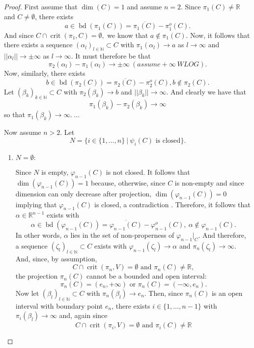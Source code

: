 \documentclass[11pt]{article}
\theoremstyle{definition}
\newcommand{\N}{\mathbb{N}}
\newcommand{\R}{\mathbb{R}}
\newcommand{\vp}{\varphi}
\DeclareMathOperator{\bd}{bd}
\DeclareMathOperator{\crit}{crit}
\begin{document}
\begin{proof}
First assume that $\dim(C)=1$ and assume $n=2$. Since $\pi_1(C) \not = \R$ and $C \not = \emptyset$, there exists 
\[
a \in \bd(\pi_1(C)) = \overline{\pi_1(C)} - \pi_1^o(C).
\]
And since $C \cap \crit(\pi_1,C) = \emptyset,$ we know that $a \not \in \pi_1(C).$ Now, it follows that there exists a sequence $(\alpha_l)_{l \in \N} \subset C$ with $\pi_1(\alpha_l) \rightarrow a$ as $l \rightarrow \infty$ and $|| \alpha_l|| \rightarrow \pm\infty$ as $l \rightarrow \infty.$ It must therefore be that 
\[
\pi_2(\alpha_l) - \pi_1(\alpha_l) \rightarrow \pm\infty ~(assume +\infty~ WLOG).
\]
Now, similarly, there exists 
\[
b \in \bd(\pi_2(C)) = \overline{\pi_2(C)} - \pi_2^o(C), b \not \in \pi_2(C).
\]
Let $(\beta_k)_{k \in \N} \subset C$ with $\pi_2(\beta_k) \rightarrow b$ and $|| \beta_k|| \rightarrow \infty.$ And clearly we have that 
\[
\pi_1(\beta_k) - \pi_2(\beta_k) \rightarrow \infty
\]
so that $\pi_1(\beta_k) \rightarrow \infty.~\hdots$
%
%
%
\par 
Now assume $n>2.$ Let 
\[
N = \big\{i \in \{1,\hdots,n\} ~|~ \psi_i(C) \textrm{ is closed}\big\}. 
\]
\begin{enumerate}
    \item $N = \emptyset:$ 
    \par 
    Since $N$ is empty, $\vp_{n-1}(C)$ is not closed. It follows that $\dim(\vp_{n-1}(C))=1$ because, otherwise, since $C$ is non-empty  and since dimension can only decrease after projection, $\dim(\vp_{n-1}(C))=0$ implying that $\vp_{n-1}(C)$ is closed, a contradiction \lightning. Therefore, it follows that $\alpha \in \R^{n-1}$ exists with 
    \[
    \alpha \in \bd(\vp_{n-1}(C)) = \overline{\vp_{n-1}(C)} - \vp_{n-1}^o(C),~ \alpha \not \in \vp_{n-1}(C).
    \]
    In other words, $\alpha$ lies in the set of non-properness of $\vp_{n-1}|_C$. And therefore, a sequence $(\zeta_l)_{l \in \N} \subset C$ exists with $\vp_{n-1}(\zeta_l) \rightarrow \alpha$ and $\pi_n(\zeta_l) \rightarrow \infty.$ And, since, by assumption, 
\[
    C \cap \crit(\pi_n,V) = \emptyset \textrm{ and  } \pi_n(C) \not = \R,
\]
the projection $\pi_n(C)$ cannot be a bounded and open interval:
\[
\pi_n(C) = (e_n,+\infty) \textrm{ or } \pi_n(C) = (-\infty,e_n). 
\]
Now let $(\beta_l)_{l \in \N} \subset C$ with $\pi_n(\beta_l) \rightarrow e_n$. Then, since $\pi_n(C)$ is an open interval with boundary point $e_n$, there exists $i \in \{1,\hdots,n-1\}$ with $\pi_i(\beta_l) \rightarrow \infty$ and, again since \[
    C \cap \crit(\pi_i,V) = \emptyset \textrm{ and  } \pi_i(C) \not = \R
\]

\end{enumerate}
\end{proof}
\end{document}
